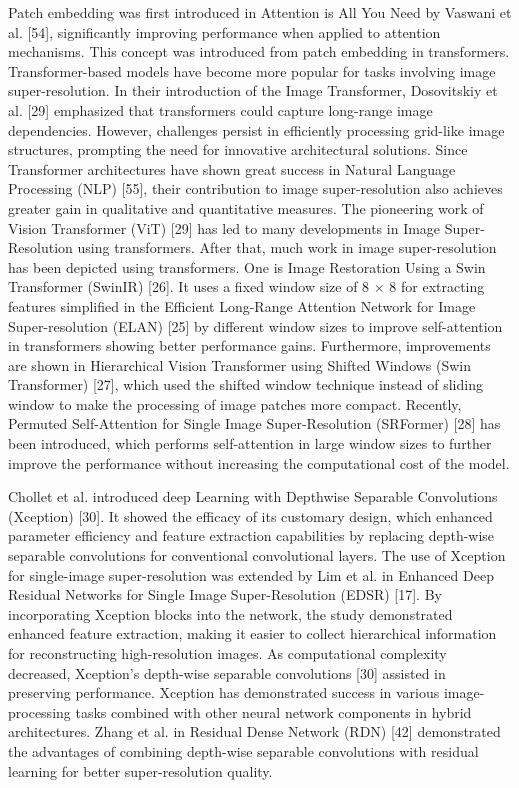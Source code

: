 \documentclass[twocolumn]{svjour3}          %
\begin{document}
Patch embedding was first introduced in Attention is All You Need by Vaswani et al. [54], significantly improving performance when applied to attention mechanisms. This concept was introduced from patch embedding in transformers. Transformer-based models have become more popular for tasks involving image super-resolution. In their introduction of the Image Transformer, Dosovitskiy et al. [29] emphasized that transformers could capture long-range image dependencies. However, challenges persist in efficiently processing grid-like image structures, prompting the need for innovative architectural solutions. Since Transformer architectures have shown great success in Natural Language Processing (NLP) [55], their contribution to image super-resolution also achieves greater gain in qualitative and quantitative measures. The pioneering work of Vision Transformer (ViT) [29] has led to many developments in Image Super-Resolution using transformers. After that, much work in image super-resolution has been depicted using transformers. One is Image Restoration Using a Swin Transformer (SwinIR) [26]. It uses a fixed window size of 8 × 8 for extracting features simplified in the Efficient Long-Range Attention Network for Image Super-resolution (ELAN) [25] by different window sizes to improve self-attention in transformers showing better performance gains. Furthermore, improvements are shown in Hierarchical Vision Transformer using Shifted Windows (Swin Transformer) [27], which used the shifted window technique instead of sliding window to make the processing of image patches more compact. Recently, Permuted Self-Attention for Single Image Super-Resolution (SRFormer) [28] has been introduced, which performs self-attention in large window sizes to further improve the performance without increasing the computational cost of the model. 

Chollet et al. introduced deep Learning with Depthwise Separable Convolutions (Xception) [30]. It showed the efficacy of its customary design, which enhanced parameter efficiency and feature extraction capabilities by replacing depth-wise separable convolutions for conventional convolutional layers. The use of Xception for single-image super-resolution was extended by Lim et al. in Enhanced Deep Residual Networks for Single Image Super-Resolution (EDSR) [17]. By incorporating Xception blocks into the network, the study demonstrated enhanced feature extraction, making it easier to collect hierarchical information for reconstructing high-resolution images. As computational complexity decreased, Xception's depth-wise separable convolutions [30] assisted in preserving performance. Xception has demonstrated success in various image-processing tasks combined with other neural network components in hybrid architectures. Zhang et al. in Residual Dense Network (RDN) [42] demonstrated the advantages of combining depth-wise separable convolutions with residual learning for better super-resolution quality.
\end{document}
